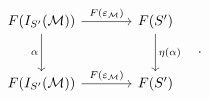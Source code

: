 \[\begin{tikzcd}[column sep=large,row sep=large]
F(I_{S'}(\mathcal M)) \arrow[r,"F(\varepsilon_{\mathcal M})"] \arrow[d,"\alpha"'] & F(S') \arrow[d,"\eta(\alpha)"]\\
F(I_{S'}(\mathcal M)) \arrow[r,"F(\varepsilon_{\mathcal M})"] & F(S')
\end{tikzcd}\quad .\]
